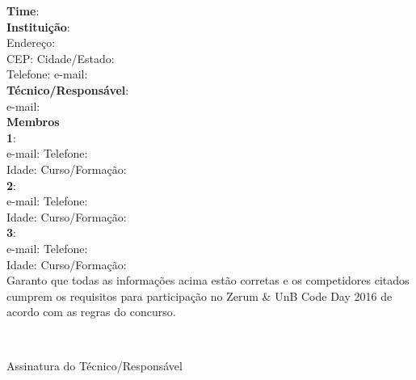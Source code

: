 \documentclass{UnBExam}%
\newcommand{\campo}[2][: ]{#2#1\hrulefill}%
\newcommand{\ca}[1]{\campo{\textbf{#1}}}%
\newcommand{\membro}[1]{%
\indent\ca{#1}\\
\indent\campo{e-mail}\campo{Telefone}\\
\indent\campo{Idade} \campo{Curso/Formação}\\
}%
\begin{document}
%
\vspace{0.5in}
\noindent
\ca{Time}\\
\ca{Instituição}\\
\indent\campo{Endereço}\\
\indent\campo{CEP} \campo{Cidade/Estado}\\
\indent\campo{Telefone} \campo{e-mail}\\
\ca{Técnico/Responsável}\\
\indent\campo{e-mail}\\
\textbf{Membros}\\
\membro{1}%
\membro{2}%
\membro{3}%

\noindent Garanto que todas as informações acima estão corretas e os competidores citados
cumprem os requisitos para participação no Zerum \& UnB Code Day 2016 de
acordo com as regras do concurso.

\vspace{\baselineskip}
\hspace{.5\textwidth}\hrulefill\\
\strut\hfill Assinatura do Técnico/Responsável
\vfill
\end{document}
